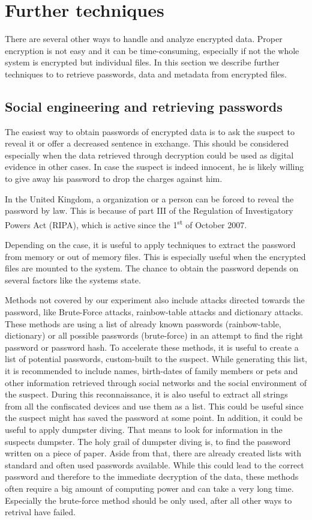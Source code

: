 \section{Further techniques}
There are several other ways to handle and analyze encrypted data. Proper encryption is not easy and it can be time-consuming, especially if not the whole system is encrypted but individual files. In this section we describe further techniques to to retrieve passwords, data and metadata from encrypted files.
\subsection{Social engineering and retrieving passwords}
The easiest way to obtain passwords of encrypted data is to ask the suspect to reveal it or offer a decreased sentence in exchange.
This should be considered especially when the data retrieved through decryption could be used as digital evidence in other cases.
In case the suspect is indeed innocent, he is likely willing to give away his password to drop the charges against him.

In the United Kingdom, a organization or a person can be forced to reveal the password by law. This is because of part III of the Regulation of Investigatory Powers Act (RIPA), which is active since  the 1\textsuperscript{st} of October 2007.\cite{lowman2010effect}

Depending on the case, it is useful to apply techniques to extract the password from memory or out of memory files. This is especially useful when the encrypted files are mounted to the system. The chance to obtain the password depends on several factors like the systems state.\cite{MaartmannMoe2009S132}

Methods not covered by our experiment also include attacks directed towards the password, like Brute-Force attacks, rainbow-table attacks and dictionary attacks. 
These methods are using a list of already known passwords (rainbow-table, dictionary) or all possible passwords (brute-force) in an attempt to find the right password or password hash.
To accelerate these methods, it is useful to create a list of potential passwords, custom-built to the suspect. 
While generating this list, it is recommended to include names, birth-dates of family members or pets and other information retrieved through social networks and the social environment of the suspect. 
During this reconnaissance, it is also useful to extract all strings from all the confiscated devices and use them as a list. 
This could be useful since the suspect might has saved the password at some point. 
In addition, it could be useful to apply dumpster diving.
That means to look for information in the suspects dumpster. 
The holy grail of dumpster diving is, to find the password written on a piece of paper. 
Aside from that, there are already created lists with standard and often used passwords available.
While this could lead to the correct password and therefore to the immediate decryption of the data, these methods often require a big amount of computing power and can take a very long time.
Especially the brute-force method should be only used, after all other ways to retrival have failed.

